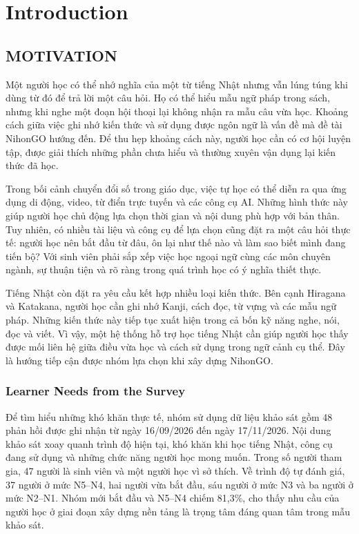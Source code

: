 \chapter{Introduction}
\label{chap:introduction}

\section{MOTIVATION}

Một người học có thể nhớ nghĩa của một từ tiếng Nhật nhưng vẫn lúng túng khi dùng từ đó để trả lời một câu hỏi. Họ có thể hiểu mẫu ngữ pháp trong sách, nhưng khi nghe một đoạn hội thoại lại không nhận ra mẫu câu vừa học. Khoảng cách giữa việc ghi nhớ kiến thức và sử dụng được ngôn ngữ là vấn đề mà đề tài NihonGO hướng đến. Để thu hẹp khoảng cách này, người học cần có cơ hội luyện tập, được giải thích những phần chưa hiểu và thường xuyên vận dụng lại kiến thức đã học.

Trong bối cảnh chuyển đổi số trong giáo dục, việc tự học có thể diễn ra qua ứng dụng di động, video, từ điển trực tuyến và các công cụ AI. Những hình thức này giúp người học chủ động lựa chọn thời gian và nội dung phù hợp với bản thân. Tuy nhiên, có nhiều tài liệu và công cụ để lựa chọn cũng đặt ra một câu hỏi thực tế: người học nên bắt đầu từ đâu, ôn lại như thế nào và làm sao biết mình đang tiến bộ? Với sinh viên phải sắp xếp việc học ngoại ngữ cùng các môn chuyên ngành, sự thuận tiện và rõ ràng trong quá trình học có ý nghĩa thiết thực.

Tiếng Nhật còn đặt ra yêu cầu kết hợp nhiều loại kiến thức. Bên cạnh Hiragana và Katakana, người học cần ghi nhớ Kanji, cách đọc, từ vựng và các mẫu ngữ pháp. Những kiến thức này tiếp tục xuất hiện trong cả bốn kỹ năng nghe, nói, đọc và viết. Vì vậy, một hệ thống hỗ trợ học tiếng Nhật cần giúp người học thấy được mối liên hệ giữa điều vừa học và cách sử dụng trong ngữ cảnh cụ thể. Đây là hướng tiếp cận được nhóm lựa chọn khi xây dựng NihonGO.

\subsection{Learner Needs from the Survey}

Để tìm hiểu những khó khăn thực tế, nhóm sử dụng dữ liệu khảo sát gồm 48 phản hồi được ghi nhận từ ngày 16/09/2026 đến ngày 17/11/2026. Nội dung khảo sát xoay quanh trình độ hiện tại, khó khăn khi học tiếng Nhật, công cụ đang sử dụng và những chức năng người học mong muốn. Trong số người tham gia, 47 người là sinh viên và một người học vì sở thích. Về trình độ tự đánh giá, 37 người ở mức N5--N4, hai người vừa bắt đầu, sáu người ở mức N3 và ba người ở mức N2--N1. Nhóm mới bắt đầu và N5--N4 chiếm 81,3\%, cho thấy nhu cầu của người học ở giai đoạn xây dựng nền tảng là trọng tâm đáng quan tâm trong mẫu khảo sát.


